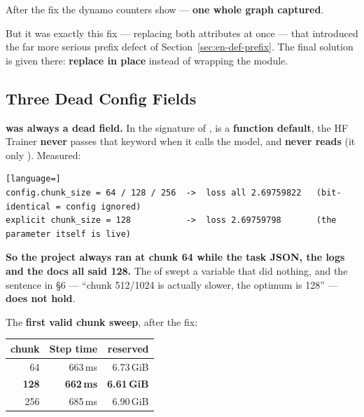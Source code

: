 \documentclass[11pt,openany]{article}
\begin{document}
After the fix the dynamo counters show
 --- \textbf{one whole graph
captured}.

\begin{notebox}
But it was exactly this fix --- replacing both attributes at once --- that introduced the far
more serious prefix defect of Section~\ref{sec:en-def-prefix}. The final solution is given
there: \textbf{replace  in place} instead of wrapping the module.
\end{notebox}

\subsection{Three Dead Config Fields}
\label{sec:en-eng-dead}

\textbf{ was always a dead field.} In the signature of
,  is a \textbf{function default}, the
HF Trainer \textbf{never} passes that keyword when it calls the model, and 
\textbf{never reads}  (it only
). Measured:

\begin{lstlisting}[language=]
config.chunk_size = 64 / 128 / 256  ->  loss all 2.69759822   (bit-identical = config ignored)
explicit chunk_size = 128           ->  loss 2.69759798       (the parameter itself is live)
\end{lstlisting}

\textbf{So the project always ran at chunk 64 while the task JSON, the logs and the docs all
said 128.} The  of  swept a
variable that did nothing, and the sentence in  \S6 --- ``chunk 512/1024 is
actually slower, the optimum is 128'' --- \textbf{does not hold}.

The \textbf{first valid chunk sweep}, after the fix:

\begin{center}\small
{}
\begin{tabular}{@{}rrr@{}}
\toprule
\textbf{chunk} & \textbf{Step time} & \textbf{reserved} \\
\midrule
64 & 663\,ms & 6.73\,GiB \\
\textbf{128} & \textbf{662\,ms} & \textbf{6.61\,GiB} \\
256 & 685\,ms & 6.90\,GiB \\
\bottomrule
\end{tabular}
\end{center}
\end{document}
